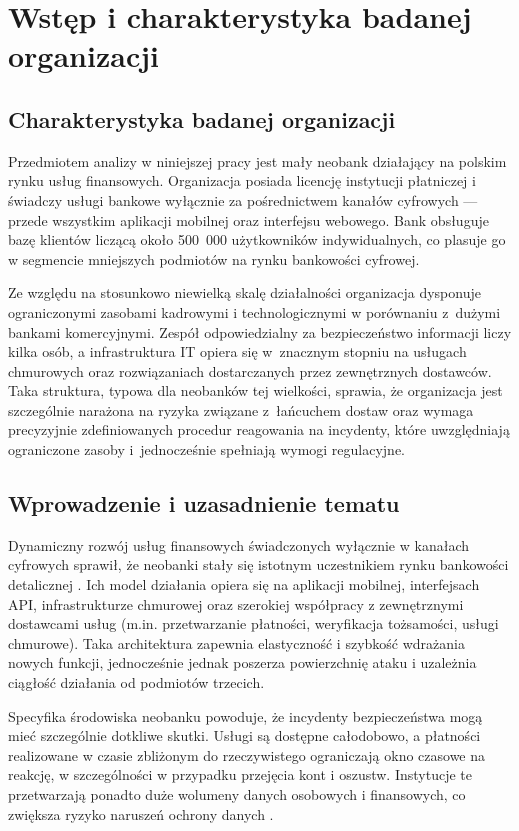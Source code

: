 \chapter{Wstęp i charakterystyka badanej organizacji}\label{ch:wstep}

\section{Charakterystyka badanej organizacji}\label{sec:charakterystyka-organizacji}
Przedmiotem analizy w niniejszej pracy jest mały neobank działający na polskim rynku usług finansowych. Organizacja posiada licencję instytucji płatniczej i świadczy usługi bankowe wyłącznie za pośrednictwem kanałów cyfrowych --- przede wszystkim aplikacji mobilnej oraz interfejsu webowego. Bank obsługuje bazę klientów liczącą około 500~000 użytkowników indywidualnych, co plasuje go w segmencie mniejszych podmiotów na rynku bankowości cyfrowej.

Ze względu na stosunkowo niewielką skalę działalności organizacja dysponuje ograniczonymi zasobami kadrowymi i technologicznymi w porównaniu z~dużymi bankami komercyjnymi. Zespół odpowiedzialny za bezpieczeństwo informacji liczy kilka osób, a infrastruktura IT opiera się w~znacznym stopniu na usługach chmurowych oraz rozwiązaniach dostarczanych przez zewnętrznych dostawców. Taka struktura, typowa dla neobanków tej wielkości, sprawia, że organizacja jest szczególnie narażona na ryzyka związane z~łańcuchem dostaw oraz wymaga precyzyjnie zdefiniowanych procedur reagowania na incydenty, które uwzględniają ograniczone zasoby i~jednocześnie spełniają wymogi regulacyjne.

\section{Wprowadzenie i uzasadnienie tematu}\label{sec:wprowadzenie}
Dynamiczny rozwój usług finansowych świadczonych wyłącznie w kanałach cyfrowych sprawił, że neobanki stały się istotnym uczestnikiem rynku bankowości detalicznej \cite{specjalisci2025}. Ich model działania opiera się na aplikacji mobilnej, interfejsach API, infrastrukturze chmurowej oraz szerokiej współpracy z zewnętrznymi dostawcami usług (m.in. przetwarzanie płatności, weryfikacja tożsamości, usługi chmurowe). Taka architektura zapewnia elastyczność i szybkość wdrażania nowych funkcji, jednocześnie jednak poszerza powierzchnię ataku i uzależnia ciągłość działania od podmiotów trzecich.

Specyfika środowiska neobanku powoduje, że incydenty bezpieczeństwa mogą mieć szczególnie dotkliwe skutki. Usługi są dostępne całodobowo, a płatności realizowane w czasie zbliżonym do rzeczywistego ograniczają okno czasowe na reakcję, w szczególności w przypadku przejęcia kont i oszustw. Instytucje te przetwarzają ponadto duże wolumeny danych osobowych i finansowych, co zwiększa ryzyko naruszeń ochrony danych \cite{pymnts2026fraud}.

